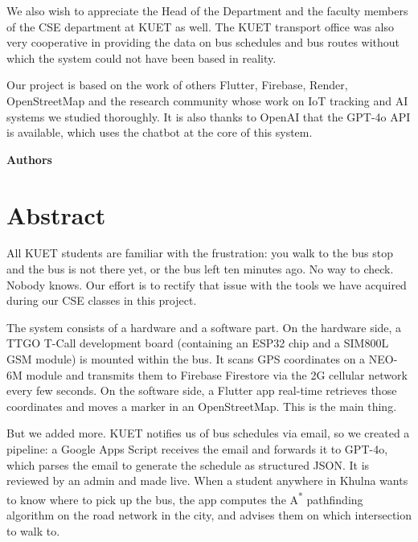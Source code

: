 \documentclass[12pt,a4paper]{report}
\begin{document}
We also wish to appreciate the Head of the Department and the faculty members of the CSE department at KUET as well. The KUET transport office was also very cooperative in providing the data on bus schedules and bus routes without which the system could not have been based in reality.

Our project is based on the work of others Flutter, Firebase, Render, OpenStreetMap and the research community whose work on IoT tracking and AI systems we studied thoroughly. It is also thanks to OpenAI that the GPT-4o API is available, which uses the chatbot at the core of this system.

\vspace{36pt}
\begin{flushright}
{\fontsize{12}{18}\selectfont\bfseries Authors}
\end{flushright}
\newpage

\chapter*{Abstract}

\vspace{24pt}

All KUET students are familiar with the frustration: you walk to the bus stop and the bus is not there yet, or the bus left ten minutes ago. No way to check. Nobody knows. Our effort is to rectify that issue with the tools we have acquired during our CSE classes in this project.

The system consists of a hardware and a software part. On the hardware side, a TTGO T-Call development board (containing an ESP32 chip and a SIM800L GSM module) is mounted within the bus. It scans GPS coordinates on a NEO-6M module and transmits them to Firebase Firestore via the 2G cellular network every few seconds. On the software side, a Flutter app real-time retrieves those coordinates and moves a marker in an OpenStreetMap. This is the main thing.

But we added more. KUET notifies us of bus schedules via email, so we created a pipeline: a Google Apps Script receives the email and forwards it to GPT-4o, which parses the email to generate the schedule as structured JSON. It is reviewed by an admin and made live. When a student anywhere in Khulna wants to know where to pick up the bus, the app computes the A\textsuperscript{*} pathfinding algorithm on the road network in the city, and advises them on which intersection to walk to.
\end{document}
